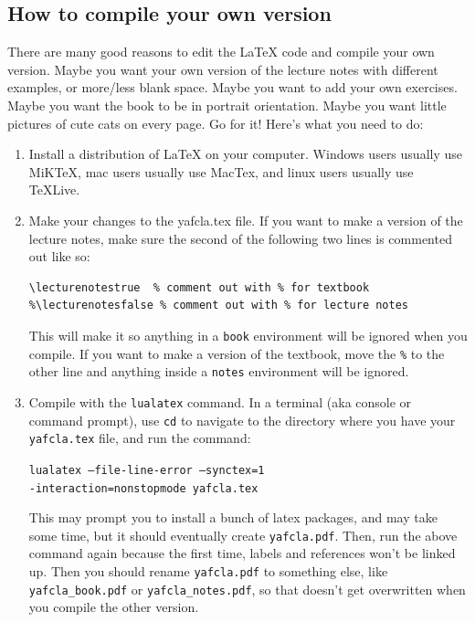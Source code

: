 \documentclass[11pt, letterpaper]{report}
\newif\iflecturenotes
\newcounter{exercise}[section]
\newcounter{example}[section]
\begin{document}
\subsection{How to compile your own version}
There are many good reasons to edit the \LaTeX{} code and compile your own version. Maybe you want your own version of the lecture notes with different examples, or more/less blank space. Maybe you want to add your own exercises. Maybe you want the book to be in portrait orientation. Maybe you want little pictures of cute cats on every page. Go for it! Here's what you need to do:
\begin{enumerate}
\item Install a distribution of \LaTeX{} on your computer. Windows users usually use MiKTeX, mac users usually use MacTex, and linux users usually use TeXLive.
\item Make your changes to the yafcla.tex file. If you want to make a version of the lecture notes, make sure the second of the following two lines is commented out like so:
\begin{verbatim}
\lecturenotestrue  % comment out with % for textbook
%\lecturenotesfalse % comment out with % for lecture notes
\end{verbatim}
This will make it so anything in a \texttt{book} environment will be ignored when you compile. If you want to make a version of the textbook, move the \texttt{\%} to the other line and anything inside a \texttt{notes} environment will be ignored.
\item Compile with the \texttt{lualatex} command. In a terminal (aka console or command prompt), use \texttt{cd} to  navigate to the directory where you have your \texttt{yafcla.tex} file, and run the command:

\texttt{lualatex --file-line-error --synctex=1 \\ -interaction=nonstopmode yafcla.tex}

This may prompt you to install a bunch of latex packages, and may take some time, but it should eventually create \texttt{yafcla.pdf}. Then, run the above command again because the first time, labels and references won't be linked up. Then you should rename \texttt{yafcla.pdf} to something else, like \texttt{yafcla\_book.pdf} or \texttt{yafcla\_notes.pdf}, so that doesn't get overwritten when you compile the other version.
\end{enumerate}
\end{document}
